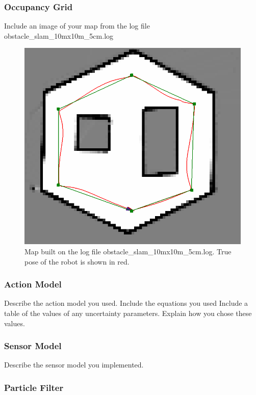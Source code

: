 \documentclass[journal]{IEEEtran}
\begin{document}
\subsubsection{Occupancy Grid}

Include an image of your map from the log file obstacle\_slam\_10mx10m\_5cm.log

\begin{figure}
    \centering
    \includegraphics[width=1\linewidth]{obstacle_slam_10mx10m_5cm-map.png}
    \caption{Map built on the log file obstacle\_slam\_10mx10m\_5cm.log. True pose of the robot is shown in red.}
    \label{fig:map}
\end{figure}


\subsubsection{Action Model}

Describe the action model you used.  Include the equations you used
Include a table of the values of any uncertainty parameters.  
Explain how you chose these values.

\subsubsection{Sensor Model}

Describe the sensor model you implemented.

\subsubsection{Particle Filter}
\end{document}
